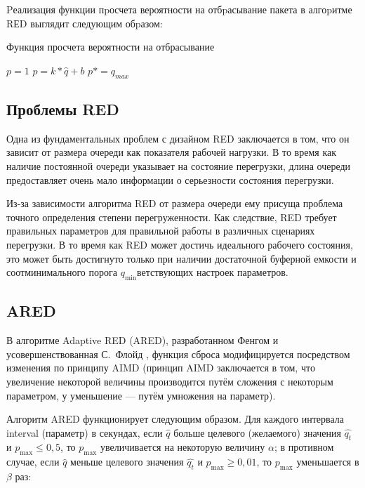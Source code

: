Pеализация функции пpосчета вероятности на отбpасывание пакета в алгоpитме RЕD
выглядит следующим обpазом:

\begin{algorithm}[H]
	\caption{Функция просчета вероятности на отбрасывание} 
	\begin{algorithmic}[1]
                \State $p = 1$
            \Else 
              \State $p = k * \hat{q} + b$
              \State $p *= q_{max}$
            \EndIf
	\end{algorithmic} 
\end{algorithm}

\subsection{Проблемы RED}
\label{chap1:sec3:sub3}

Одна из фундаментальных проблем с дизайном RED заключается в том, что он
зависит от размера очереди как показателя рабочей нагрузки. В то время как
наличие постоянной очереди указывает на состояние перегрузки, длина очереди
предоставляет очень мало информации о серьезности состояния перегрузки. 

Из-за зависимости алгоритма RED от размера очереди ему присуща проблема точного
определения степени перегруженности. Как следствие, RED требует
правильных параметров для правильной работы в различных
сценариях перегрузки. В то время как RED может достичь идеального рабочего
состояния, это может быть достигнуто только при наличии достаточной буферной
емкости и соотминимального порога $q_{\min}$ветствующих настроек параметров.


\subsection{ARED}
\label{chap1:sec3:sub4}

В алгоритме Adaptive RED (ARED), разработанном Фенгом
\cite{ARED_1,ARED_2} и усовершенствованная С.~Флойд \cite{ARED_3},
функция сброса модифицируется посредством изменения по принципу AIMD
(принцип AIMD заключается в том, что увеличение некоторой величины
производится путём сложения с некоторым параметром, у уменьшение ---
путём умножения на параметр).

Алгоритм ARED функционирует следующим образом. Для каждого интервала
interval (параметр) в секундах, если $\hat{q}$ больше целевого
(желаемого) значения $\hat{q_t}$ и $p_{\max} \leqslant 0,5$, то $p_{\max}$
увеличивается на некоторую величину $\alpha$; в противном случае, если
$\hat{q}$ меньше целевого значения $\hat{q_t}$ и $p_{\max}\geqslant 0,01$, то
$p_{\max}$ уменьшается в $\beta$ раз:

